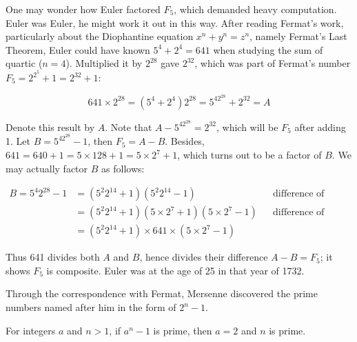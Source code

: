 \documentclass[b5paper]{article}
\begin{document}
\begin{mdframed}
One may wonder how Euler factored $F_5$, which demanded heavy computation. Euler was Euler, he might work it out in this way. After reading Fermat's work, particularly about the Diophantine equation $x^n + y^n = z^n$, namely Fermat's Last Theorem, Euler could have known $5^4 + 2^4= 641$ when studying the sum of quartic ($n = 4$). Multiplied it by $2^{28}$ gave $2^{32}$, which was part of Fermat's number $F_5 = 2^{2^5} + 1 = 2^{32} + 1$:

\[
641 \times 2^{28} = (5^4 + 2^4)2^{28} = 5^42^{28} + 2^{32} = A
\]

Denote this result by $A$. Note that $A - 5^42^{28} = 2^{32}$, which will be $F_5$ after adding 1. Let $B = 5^42^{28} - 1$, then $F_5 = A - B$. Besides, $641 = 640 + 1 = 5 \times 128 + 1 = 5 \times 2^{7} + 1$, which turns out to be a factor of $B$. We may actually factor $B$ as follows:

\begin{align*}
B = 5^4 2^{28} - 1 &= (5^2 2^{14} + 1)(5^2 2^{14} - 1) && \text{difference of squares} \\
  &= (5^2 2^{14} + 1)(5 \times 2^7 + 1)(5 \times 2^7 - 1) && \text{difference of squares} \\
  &= (5^2 2^{14} + 1) \times 641 \times (5 \times 2^7 - 1)
\end{align*}

Thus 641 divides both $A$ and $B$, hence divides their difference $A - B = F_5$; it shows $F_5$ is composite. Euler was at the age of 25 in that year of 1732.
\end{mdframed}

Through the correspondence with Fermat, Mersenne discovered the prime numbers named after him in the form of $2^n - 1$.

\begin{proposition}
For integers $a$ and $n > 1$, if $a^n - 1$ is prime, then $a = 2$ and $n$ is prime.
\end{proposition}
\end{document}
